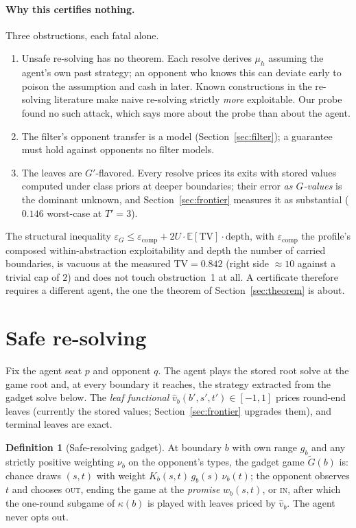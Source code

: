 \documentclass[11pt]{article}
\theoremstyle{plain}
\theoremstyle{definition}
\newtheorem{definition}[theorem]{Definition}
\theoremstyle{remark}
\newcommand{\game}{\ensuremath{G}}
\newcommand{\gp}{\ensuremath{G'}}
\newcommand{\epsG}{\ensuremath{\varepsilon_{\game}}}
\begin{document}
\paragraph{Why this certifies nothing.} Three obstructions, each
fatal alone.
\begin{enumerate}\itemsep2pt
\item Unsafe re-solving has no theorem. Each resolve derives $\mu_h$
      assuming the agent's own past strategy; an opponent who knows
      this can deviate early to poison the assumption and cash in
      later. Known constructions in the re-solving literature make
      naive re-solving strictly \emph{more} exploitable. Our probe
      found no such attack, which says more about the probe than about
      the agent.
\item The filter's opponent transfer is a model
      (Section~\ref{sec:filter}); a guarantee must hold against
      opponents no filter models.
\item The leaves are $\gp$-flavored. Every resolve prices its exits
      with stored values computed under class priors at deeper
      boundaries; their error \emph{as $\game$-values} is the dominant
      unknown, and Section~\ref{sec:frontier} measures it as
      substantial ($0.146$ worst-case at $T'{=}3$).
\end{enumerate}
The structural inequality
$\epsG \le \varepsilon_{\mathrm{comp}}
+ 2U\cdot\mathbb{E}[\mathrm{TV}]\cdot\mathrm{depth}$,
with $\varepsilon_{\mathrm{comp}}$ the profile's composed
within-abstraction exploitability and depth the number of carried
boundaries, is vacuous at the measured $\mathrm{TV}=0.842$ (right side
${\approx}10$ against a trivial cap of $2$) and does not touch
obstruction~1 at all. A certificate therefore requires a different
agent, the one the theorem of Section~\ref{sec:theorem} is about.

\section{Safe re-solving}\label{sec:gadget}

Fix the agent seat $p$ and opponent $q$. The agent plays the stored
root solve at the game root and, at every boundary it reaches, the
strategy extracted from the gadget solve below. The \emph{leaf
functional} $\hat v_b(b',s',t')\in[-1,1]$ prices round-end leaves
(currently the stored values; Section~\ref{sec:frontier} upgrades
them), and terminal leaves are exact.

\begin{definition}[Safe-resolving gadget]\label{def:gadget}
At boundary $b$ with own range $g_b$ and any strictly positive
weighting $\nu_b$ on the opponent's types, the gadget game
$\tilde G(b)$ is: chance draws $(s,t)$ with weight
$K_b(s,t)\,g_b(s)\,\nu_b(t)$; the opponent observes $t$ and chooses
\textsc{out}, ending the game at the \emph{promise} $w_b(s,t)$, or
\textsc{in}, after which the one-round subgame of $\kappa(b)$ is
played with leaves priced by $\hat v_b$. The agent never opts out.
\end{definition}
\end{document}
